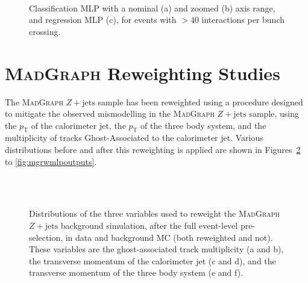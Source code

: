 \documentclass[NOTE, atlasdraft=true, texlive=2017, UKenglish]{\ATLASLATEXPATH atlasdoc}
\begin{document}
\begin{figure}[!htbp]
  \centering
  \\
  \caption{Classification MLP with a nominal (a) and zoomed (b) axis range, and regression MLP (c), for events with $>40$ interactions per bunch crossing.}
  \label{fig:pileup40toINF}
\end{figure}


\clearpage
\section{\textsc{MadGraph} Reweighting Studies}
\label{app:MGRW}

The \textsc{MadGraph} $Z+\text{jets}$ sample has been reweighted using a procedure designed to mitigate the observed mismodelling in the \textsc{MadGraph} $Z+\text{jets}$ sample, using the $p_\text{T}$ of the calorimeter jet, the $p_\text{T}$ of the three body system, and the multiplicity of tracks Ghost-Associated to the calorimeter jet. Various distributions before and after this reweighting is applied are shown in Figures~\ref{fig:mgrwvars} to \ref{fig:mgrwmlpoutputs}.

\begin{figure}[!htbp]
  \centering
  \\
  \\
  \caption{Distributions of the three variables used to reweight the \textsc{MadGraph} $Z+\text{jets}$ background simulation, after the full event-level pre-selection, in data and background MC (both reweighted and not). These variables are the ghost-associated track multiplicity (a and b), the transverse momentum of the calorimeter jet (c and d), and the transverse momentum of the three body system (e and f).}
  \label{fig:mgrwvars}
\end{figure}
\end{document}
